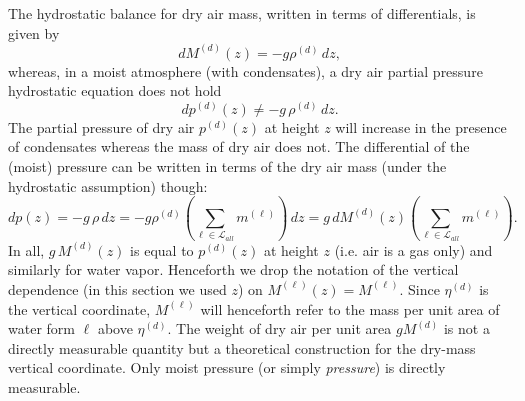 \documentclass{agujournal}
\begin{document}
{The hydrostatic balance for dry air mass, written in terms of differentials, is given by
\begin{equation}
dM^{(d)}(z)=-g\rho^{(d)}\, dz,\label{eq:dry_atm_hydro}
\end{equation}
whereas, in a moist atmosphere (with condensates), a dry air partial pressure hydrostatic equation does not hold
\begin{equation}
dp^{(d)}(z)\ne -g\, \rho^{(d)}\, dz.
\end{equation}
The partial pressure of dry air $p^{(d)}(z)$ at height $z$ will increase in the presence of condensates whereas the mass of dry air does not. The differential of the (moist) pressure can be written in terms of the dry air mass (under the hydrostatic assumption) though:
\begin{equation}
dp(z)=-g\, \rho \, dz = -g\rho^{(d)} \left( \sum_{\ell \in \mathcal{L}_{all}} m^{(\ell)}\right)\, dz = g\, dM^{(d)}(z)\left( \sum_{\ell \in \mathcal{L}_{all}} m^{(\ell)}\right).
\end{equation}
In all, $g\, M^{(d)}(z)$ is equal to $p^{(d)}(z)$ at height $z$ {\color{red}{only if there are no condensates present at higher levels}}  (i.e. air is a gas only) and similarly for water vapor. Henceforth we drop the notation of the vertical dependence (in this section we used $z$) on $M^{(\ell)}(z)=M^{(\ell)}$. Since $\eta^{(d)}$ is the vertical coordinate, $M^{(\ell)}$ will henceforth refer to the mass per unit area of  water form $\ell$ above $\eta^{(d)}$. The weight of dry air per unit area $g M^{(d)}$ is not a directly measurable quantity but a theoretical construction for the dry-mass vertical coordinate. Only moist pressure (or simply {\em{pressure}}) is directly measurable.

%
}
\end{document}
